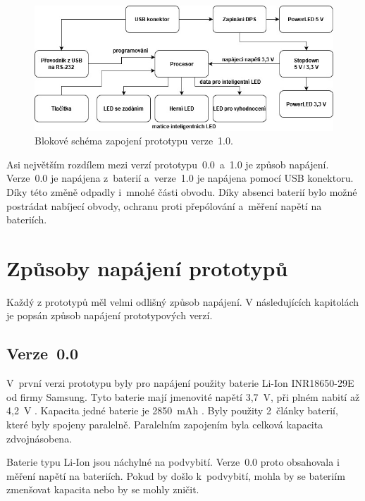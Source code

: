   \begin{figure}[!h]
    \begin{center}
      \includegraphics[scale=0.5]{obrazky/v1_blokove_schema.jpg}
    \end{center}
    \caption[Blokové schéma zapojení prototypu verze~1.0]{Blokové schéma zapojení prototypu verze~1.0.}
  \end{figure}

  Asi největším rozdílem mezi verzí prototypu~0.0~a~1.0 je způsob napájení. Verze~0.0 je napájena z~baterií a~verze~1.0 je napájena pomocí USB 
  konektoru. Díky této změně 
  odpadly i~mnohé části obvodu. Díky absenci baterií bylo možné postrádat nabíjecí obvody, ochranu proti přepólování a~měření napětí 
  na bateriích.       

  \section{Způsoby napájení prototypů}
  Každý z prototypů měl velmi odlišný způsob napájení. V následujících kapitolách je popsán způsob napájení prototypových verzí.

  \subsection{Verze~0.0}
  V~první verzi prototypu byly pro napájení použity baterie Li-Ion INR18650-29E od firmy Samsung. Tyto baterie mají jmenovité napětí 3,7~V, 
  při plném nabití až 4,2~V \cite{18650}. Kapacita jedné baterie je 2850~mAh \cite{18650}. Byly použity 2~články baterií, které byly spojeny 
  paralelně. Paralelním zapojením byla celková kapacita zdvojnásobena.

  Baterie typu Li-Ion jsou náchylné na podvybití. Verze~0.0 proto obsahovala i měření napětí na bateriích. Pokud by došlo k~podvybití, mohla 
  by se bateriím zmenšovat kapacita nebo by se mohly zničit. 

